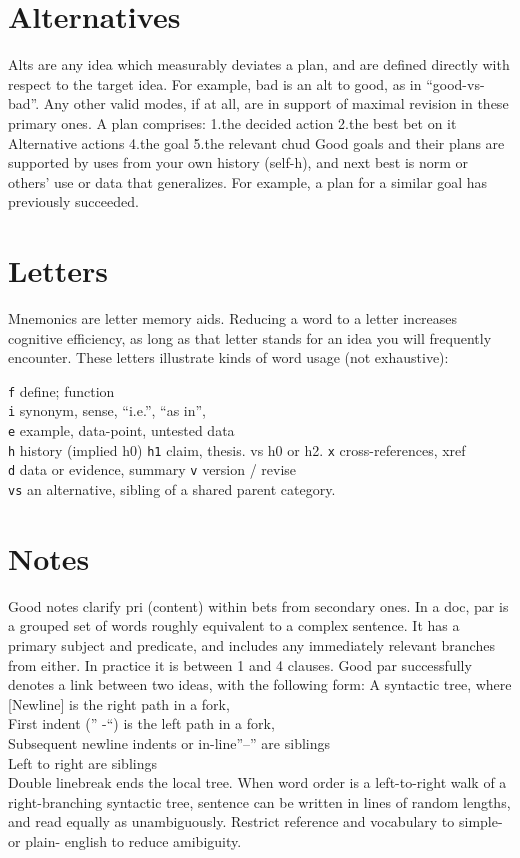 \documentclass[
]{book}
\begin{document}
\section{Alternatives}\label{word-alternatives}

Alts are any idea which measurably deviates a plan, and are defined directly with respect to the target idea.
For example, bad is an alt to good, as in ``good-vs-bad''.
Any other valid modes, if at all, are in support of maximal revision in these primary ones.
A plan comprises: 1.the decided action 2.the best bet on it
Alternative actions 4.the goal 5.the relevant chud
Good goals and their plans are supported by uses from your own history (self-h), and next best is norm or others' use or data that generalizes.
For example, a plan for a similar goal has previously succeeded.

\section{Letters}\label{letters}

Mnemonics are letter memory aids.
Reducing a word to a letter increases cognitive efficiency, as long as that letter stands for an idea you will frequently encounter.
These letters illustrate kinds of word usage (not exhaustive):

\texttt{f} define; function\\
\texttt{i} synonym, sense, ``i.e.'', ``as in'',\\
\texttt{e} example, data-point, untested data\\
\texttt{h} history (implied h0)
\texttt{h1} claim, thesis. vs h0 or h2.
\texttt{x} cross-references, xref\\
\texttt{d} data or evidence, summary
\texttt{v} version / revise\\
\texttt{vs} an alternative, sibling of a shared parent category.

\section{Notes}\label{notes}

Good notes clarify pri (content) within bets from secondary ones.
In a doc, par is a grouped set of words roughly equivalent to a complex sentence.
It has a primary subject and predicate, and includes any immediately relevant branches from either.
In practice it is between 1 and 4 clauses.
Good par successfully denotes a link between two ideas, with the following form:
A syntactic tree, where\\
{[}Newline{]} is the right path in a fork,\\
First indent ('' -``) is the left path in a fork,\\
Subsequent newline indents or in-line''--'' are siblings\\
Left to right are siblings\\
Double linebreak ends the local tree.
When word order is a left-to-right walk of a right-branching syntactic tree, sentence can be written in lines of random lengths, and read equally as unambiguously.
Restrict reference and vocabulary to simple- or plain- english to reduce amibiguity.
\end{document}
